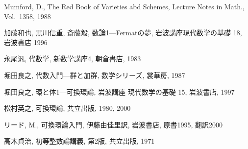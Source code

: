 \documentclass[12pt,twoside]{jarticle}
\begin{document}
\begin{thebibliography}{AB}



Mumford, D., The Red Book of Varieties abd Schemes, 
Lecture Notes in Math., Vol.~1358, 1988


加藤和也, 黒川信重, 斎藤毅, 数論1---Fermatの夢, 岩波講座現代数学の基礎 18,
岩波書店 1996



永尾汎, 代数学, 新数学講座4, 朝倉書店, 1983

堀田良之, 代数入門---群と加群, 数学シリーズ, 裳華房, 1987


堀田良之, 環と体1---可換環論, 岩波講座 現代数学の基礎 15, 岩波書店, 1997

松村英之, 可換環論, 共立出版, 1980, 2000

リード, M., 可換環論入門, 伊藤由佳里訳, 岩波書店, 原書1995, 翻訳2000

高木貞治, 初等整数論講義, 第2版, 共立出版, 1971

\end{thebibliography}

\end{document}

